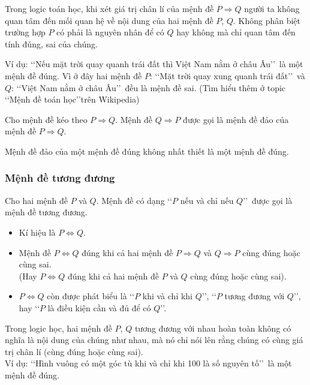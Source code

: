 \begin{tomtat}
\begin{note}
	Trong logic toán học, khi xét giá trị chân lí của mệnh đề $P\Rightarrow Q$ người ta không quan tâm đến mối quan hệ về nội dung của hai mệnh đề $P$, $Q$. Không phân biệt trường hợp $P$ có phải là nguyên nhân để có $Q$ hay không mà chỉ quan tâm đến tính đúng, sai của chúng.
	
	Ví dụ: \lq\lq Nếu mặt trời quay quanh trái đất thì Việt Nam nằm ở châu Âu\rq\rq\ là một mệnh đề đúng. Vì ở đây hai mệnh đề $P$: \lq\lq Mặt trời quay xung quanh trái đất\rq\rq\ và $Q$: \lq\lq Việt Nam nằm ở châu Âu\rq\rq\ đều là mệnh đề sai.
	(Tìm hiểu thêm ở topic \lq\lq Mệnh đề toán học\rq\rq trên Wikipedia)
\end{note}

\begin{boxdn}{}
	Cho mệnh đề kéo theo $P\Rightarrow Q$. Mệnh đề $Q\Rightarrow P$ được gọi là mệnh đề đảo của mệnh đề $P\Rightarrow Q$.
\end{boxdn}

\begin{note}
	Mệnh đề đảo của một mệnh đề đúng không nhất thiết là một mệnh đề đúng.
\end{note}

\subsubsection{Mệnh đề tương đương}

\begin{boxdn}{}
	Cho hai mệnh đề $P$ và $Q$. Mệnh đề có dạng \lq\lq $P$ nếu và chỉ nếu $Q$\rq\rq\ được gọi là mệnh đề tương đương.
	\begin{itemize}
		\item Kí hiệu là $P \Leftrightarrow Q$.
		\item Mệnh đề $P \Leftrightarrow Q$ đúng khi cả hai mệnh đề $P\Rightarrow Q$ và $Q \Rightarrow P$ cùng đúng hoặc cùng sai. \\
		(Hay $P \Leftrightarrow Q$ đúng khi cả hai mệnh đề $P$ và $Q$ cùng đúng hoặc cùng sai).
		\item $P\Leftrightarrow Q$ còn được phát biểu là \lq\lq $P$ khi và chỉ khi $Q$\rq\rq, \lq\lq $P$ tương đương với $Q$\rq\rq, hay \lq\lq $P$ là điều kiện cần và đủ để có $Q$\rq\rq.
	\end{itemize}
\end{boxdn}

\begin{note}
	Trong logic học, hai mệnh đề $P$, $Q$ tương đương với nhau hoàn toàn không có nghĩa là nội dung của chúng như nhau, mà nó chỉ nói lên rằng chúng có cùng giá trị chân lí (cùng đúng hoặc cùng sai).\\
	Ví dụ: \lq\lq Hình vuông có một góc tù khi và chỉ khi 100 là số nguyên tố\rq\rq\ là một mệnh đề đúng.
\end{note}


\end{tomtat}
